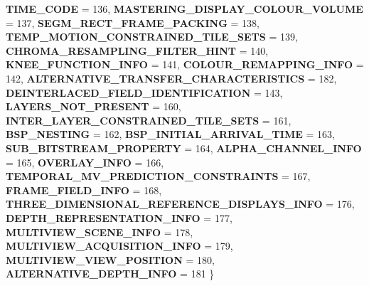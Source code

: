 \begin{DoxyCompactItemize}
\newline
{\bfseries T\+I\+M\+E\+\_\+\+C\+O\+DE} = 136, 
{\bfseries M\+A\+S\+T\+E\+R\+I\+N\+G\+\_\+\+D\+I\+S\+P\+L\+A\+Y\+\_\+\+C\+O\+L\+O\+U\+R\+\_\+\+V\+O\+L\+U\+ME} = 137, 
{\bfseries S\+E\+G\+M\+\_\+\+R\+E\+C\+T\+\_\+\+F\+R\+A\+M\+E\+\_\+\+P\+A\+C\+K\+I\+NG} = 138, 
{\bfseries T\+E\+M\+P\+\_\+\+M\+O\+T\+I\+O\+N\+\_\+\+C\+O\+N\+S\+T\+R\+A\+I\+N\+E\+D\+\_\+\+T\+I\+L\+E\+\_\+\+S\+E\+TS} = 139, 
\newline
{\bfseries C\+H\+R\+O\+M\+A\+\_\+\+R\+E\+S\+A\+M\+P\+L\+I\+N\+G\+\_\+\+F\+I\+L\+T\+E\+R\+\_\+\+H\+I\+NT} = 140, 
{\bfseries K\+N\+E\+E\+\_\+\+F\+U\+N\+C\+T\+I\+O\+N\+\_\+\+I\+N\+FO} = 141, 
{\bfseries C\+O\+L\+O\+U\+R\+\_\+\+R\+E\+M\+A\+P\+P\+I\+N\+G\+\_\+\+I\+N\+FO} = 142, 
{\bfseries A\+L\+T\+E\+R\+N\+A\+T\+I\+V\+E\+\_\+\+T\+R\+A\+N\+S\+F\+E\+R\+\_\+\+C\+H\+A\+R\+A\+C\+T\+E\+R\+I\+S\+T\+I\+CS} = 182, 
\newline
{\bfseries D\+E\+I\+N\+T\+E\+R\+L\+A\+C\+E\+D\+\_\+\+F\+I\+E\+L\+D\+\_\+\+I\+D\+E\+N\+T\+I\+F\+I\+C\+A\+T\+I\+ON} = 143, 
{\bfseries L\+A\+Y\+E\+R\+S\+\_\+\+N\+O\+T\+\_\+\+P\+R\+E\+S\+E\+NT} = 160, 
{\bfseries I\+N\+T\+E\+R\+\_\+\+L\+A\+Y\+E\+R\+\_\+\+C\+O\+N\+S\+T\+R\+A\+I\+N\+E\+D\+\_\+\+T\+I\+L\+E\+\_\+\+S\+E\+TS} = 161, 
{\bfseries B\+S\+P\+\_\+\+N\+E\+S\+T\+I\+NG} = 162, 
\newline
{\bfseries B\+S\+P\+\_\+\+I\+N\+I\+T\+I\+A\+L\+\_\+\+A\+R\+R\+I\+V\+A\+L\+\_\+\+T\+I\+ME} = 163, 
{\bfseries S\+U\+B\+\_\+\+B\+I\+T\+S\+T\+R\+E\+A\+M\+\_\+\+P\+R\+O\+P\+E\+R\+TY} = 164, 
{\bfseries A\+L\+P\+H\+A\+\_\+\+C\+H\+A\+N\+N\+E\+L\+\_\+\+I\+N\+FO} = 165, 
{\bfseries O\+V\+E\+R\+L\+A\+Y\+\_\+\+I\+N\+FO} = 166, 
\newline
{\bfseries T\+E\+M\+P\+O\+R\+A\+L\+\_\+\+M\+V\+\_\+\+P\+R\+E\+D\+I\+C\+T\+I\+O\+N\+\_\+\+C\+O\+N\+S\+T\+R\+A\+I\+N\+TS} = 167, 
{\bfseries F\+R\+A\+M\+E\+\_\+\+F\+I\+E\+L\+D\+\_\+\+I\+N\+FO} = 168, 
{\bfseries T\+H\+R\+E\+E\+\_\+\+D\+I\+M\+E\+N\+S\+I\+O\+N\+A\+L\+\_\+\+R\+E\+F\+E\+R\+E\+N\+C\+E\+\_\+\+D\+I\+S\+P\+L\+A\+Y\+S\+\_\+\+I\+N\+FO} = 176, 
{\bfseries D\+E\+P\+T\+H\+\_\+\+R\+E\+P\+R\+E\+S\+E\+N\+T\+A\+T\+I\+O\+N\+\_\+\+I\+N\+FO} = 177, 
\newline
{\bfseries M\+U\+L\+T\+I\+V\+I\+E\+W\+\_\+\+S\+C\+E\+N\+E\+\_\+\+I\+N\+FO} = 178, 
{\bfseries M\+U\+L\+T\+I\+V\+I\+E\+W\+\_\+\+A\+C\+Q\+U\+I\+S\+I\+T\+I\+O\+N\+\_\+\+I\+N\+FO} = 179, 
{\bfseries M\+U\+L\+T\+I\+V\+I\+E\+W\+\_\+\+V\+I\+E\+W\+\_\+\+P\+O\+S\+I\+T\+I\+ON} = 180, 
{\bfseries A\+L\+T\+E\+R\+N\+A\+T\+I\+V\+E\+\_\+\+D\+E\+P\+T\+H\+\_\+\+I\+N\+FO} = 181
 \}
\end{DoxyCompactItemize}
